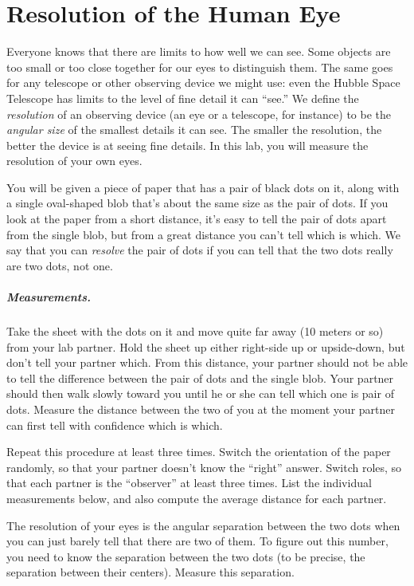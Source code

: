 \chapter{Resolution of the Human Eye}

Everyone knows that there are limits to how well we can see. Some
objects are too small or too close together for our eyes to distinguish
them. The same goes for any telescope or other observing device we
might use: even the Hubble Space Telescope has limits to the level of fine
detail it can ``see.''
We define the \textit{resolution} of an observing device (an eye
or a  telescope,
for instance) to be the \textit{angular size} of
the smallest details it can see. The smaller the resolution, the
better the device is at seeing fine details.
In this lab, you will measure the resolution of your own eyes.

You will be given a piece of paper that has a pair of black dots on it,
along with a single oval-shaped blob that's about the same size as the
pair of dots. If you look at the paper from a short distance, it's
easy to tell the pair of dots apart from the single blob, but from
a great distance you can't tell which is which.
We say that you can \textit{resolve} the pair of dots if you
can tell that the two dots really are two dots, not one.

\paragraph{Measurements.}
Take the sheet with the dots on it and move quite far away (10 meters
or so) from your lab partner. Hold the sheet up either right-side up
or upside-down, but don't tell your partner which. From this
distance, your partner should not be able to tell the difference
between the pair of dots and the single blob.
Your partner
should then walk slowly toward you until he or she can tell which 
one is pair of dots. Measure the distance between the two of you
at the moment your partner can first tell with confidence
which is which.

Repeat this procedure at least three times. Switch the orientation
of the paper randomly, so that your partner doesn't know the ``right''
answer. Switch roles, so that each partner is the ``observer'' 
at least three times.
List the individual measurements below, and
also compute the average distance for each partner.


\vskip 2.5in

The resolution of your eyes is the angular separation between the
two dots when you can just barely tell that there are two of them.
To figure out this number, you need to know the 
separation between the two dots (to be precise, the separation between
their centers). Measure this separation.

